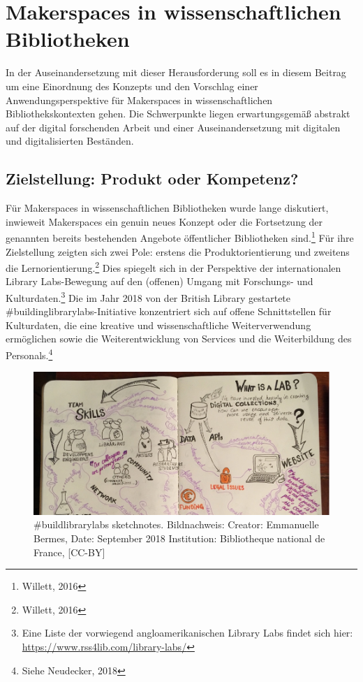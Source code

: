 \documentclass[a4paper,
fontsize=11pt,
oneside,
numbers=noperiodatend,
parskip=half-,
bibliography=totoc,
final
]{scrartcl}
\begin{document}
\hypertarget{makerspaces-in-wissenschaftlichen-bibliotheken}{%
\section{Makerspaces in wissenschaftlichen
Bibliotheken}\label{makerspaces-in-wissenschaftlichen-bibliotheken}}

In der Auseinandersetzung mit dieser Herausforderung soll es in diesem
Beitrag um eine Einordnung des Konzepts und den Vorschlag einer
Anwendungsperspektive für Makerspaces in wissenschaftlichen
Bibliothekskontexten gehen. Die Schwerpunkte liegen erwartungsgemäß
abstrakt auf der digital forschenden Arbeit und einer Auseinandersetzung
mit digitalen und digitalisierten Beständen.

\hypertarget{zielstellung-produkt-oder-kompetenz}{%
\subsection{Zielstellung: Produkt oder
Kompetenz?}\label{zielstellung-produkt-oder-kompetenz}}

Für Makerspaces in wissenschaftlichen Bibliotheken wurde lange
diskutiert, inwieweit Makerspaces ein genuin neues Konzept oder die
Fortsetzung der genannten bereits bestehenden Angebote öffentlicher
Bibliotheken sind.\footnote{Willett, 2016} Für ihre Zielstellung zeigten
sich zwei Pole: erstens die Produktorientierung und zweitens die
Lernorientierung.\footnote{Willett, 2016} Dies spiegelt sich in der
Perspektive der internationalen Library Labs-Bewegung auf den (offenen)
Umgang mit Forschungs- und Kulturdaten.\footnote{Eine Liste der
  vorwiegend angloamerikanischen Library Labs findet sich hier:
  \url{https://www.rss4lib.com/library-labs/}} Die im Jahr 2018 von der
British Library gestartete \#buildinglibrarylabs-Initiative konzentriert
sich auf offene Schnittstellen für Kulturdaten, die eine kreative und
wissenschaftliche Weiterverwendung ermöglichen sowie die
Weiterentwicklung von Services und die Weiterbildung des
Personals.\footnote{Siehe Neudecker, 2018}

\begin{figure}
\centering
\includegraphics{abbildung_1.png}
\caption{\#buildlibrarylabs sketchnotes. Bildnachweis: Creator:
Emmanuelle Bermes, Date: September 2018 Institution: Bibliotheque
national de France, {[}CC-BY{]}}
\end{figure}
\end{document}
